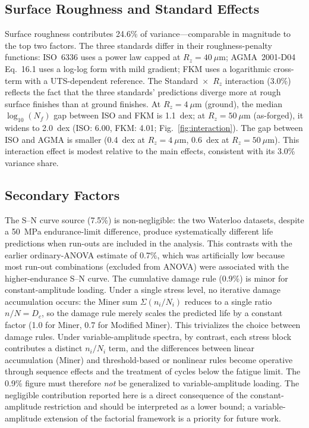 \documentclass[12pt,a4paper]{article}
\begin{document}
\subsection{Surface Roughness and Standard Effects}

Surface roughness contributes 24.6\% of variance---comparable in magnitude
to the top two factors. The three standards differ in their
roughness-penalty functions: ISO~6336 uses a power law capped at
$R_z=40~\mu$m; AGMA~2001-D04 Eq.~16.1 uses a log-log form with mild
gradient; FKM uses a logarithmic cross-term with a UTS-dependent
reference. The Standard~$\times$~$R_z$ interaction (3.0\%) reflects the
fact that the three standards' predictions diverge more at rough surface
finishes than at ground finishes. At $R_z=4~\mu$m (ground), the median
$\log_{10}(N_f)$ gap between ISO and FKM is 1.1~dex; at
$R_z=50~\mu$m (as-forged), it widens to 2.0~dex (ISO: 6.00, FKM: 4.01;
Fig.~\ref{fig:interaction}). The gap between ISO and AGMA is smaller
(0.4~dex at $R_z=4~\mu$m, 0.6~dex at $R_z=50~\mu$m). This interaction
effect is modest relative to the main effects, consistent with its
3.0\% variance share.

\subsection{Secondary Factors}

The S--N curve source (7.5\%) is non-negligible: the two Waterloo
datasets, despite a 50~MPa endurance-limit difference, produce
systematically different life predictions when run-outs are included
in the analysis. This contrasts with the earlier ordinary-ANOVA
estimate of 0.7\%, which was artificially low because most run-out
combinations (excluded from ANOVA) were associated with the
higher-endurance S--N curve. The cumulative damage rule (0.9\%) is
minor for constant-amplitude loading. Under a single stress level,
no iterative damage accumulation occurs: the Miner sum
$\Sigma(n_i/N_i)$ reduces to a single ratio $n/N = D_c$, so the
damage rule merely scales the predicted life by a constant factor
(1.0 for Miner, 0.7 for Modified Miner). This trivializes the
choice between damage rules. Under variable-amplitude spectra,
by contrast, each stress block contributes a distinct $n_i/N_i$
term, and the differences between linear accumulation (Miner) and
threshold-based or nonlinear rules become operative through sequence
effects and the treatment of cycles below the fatigue limit. The
0.9\% figure must therefore \emph{not} be generalized to
variable-amplitude loading.
The negligible contribution reported here is a direct consequence of
the constant-amplitude restriction and should be interpreted as a
lower bound; a variable-amplitude extension of the factorial
framework is a priority for future work.
\end{document}

